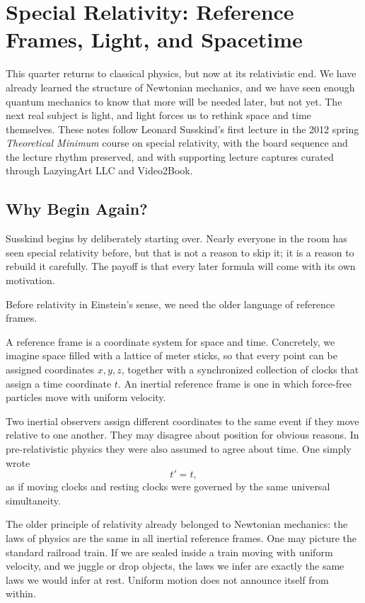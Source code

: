 \chapter{Special Relativity: Reference Frames, Light, and Spacetime}

This quarter returns to classical physics, but now at its relativistic end. We have already learned the structure of Newtonian mechanics, and we have seen enough quantum mechanics to know that more will be needed later, but not yet. The next real subject is light, and light forces us to rethink space and time themselves. These notes follow Leonard Susskind's first lecture in the 2012 spring \emph{Theoretical Minimum} course on special relativity, with the board sequence and the lecture rhythm preserved, and with supporting lecture captures curated through LazyingArt LLC and Video2Book.

\section{Why Begin Again?}

Susskind begins by deliberately starting over. Nearly everyone in the room has seen special relativity before, but that is not a reason to skip it; it is a reason to rebuild it carefully. The payoff is that every later formula will come with its own motivation.

Before relativity in Einstein's sense, we need the older language of reference frames.

\begin{definition}
A reference frame is a coordinate system for space and time. Concretely, we imagine space filled with a lattice of meter sticks, so that every point can be assigned coordinates \(x,y,z\), together with a synchronized collection of clocks that assign a time coordinate \(t\). An inertial reference frame is one in which force-free particles move with uniform velocity.
\end{definition}

Two inertial observers assign different coordinates to the same event if they move relative to one another. They may disagree about position for obvious reasons. In pre-relativistic physics they were also assumed to agree about time. One simply wrote
\begin{equation}
t'=t,
\end{equation}
as if moving clocks and resting clocks were governed by the same universal simultaneity.

The older principle of relativity already belonged to Newtonian mechanics: the laws of physics are the same in all inertial reference frames. One may picture the standard railroad train. If we are sealed inside a train moving with uniform velocity, and we juggle or drop objects, the laws we infer are exactly the same laws we would infer at rest. Uniform motion does not announce itself from within.

